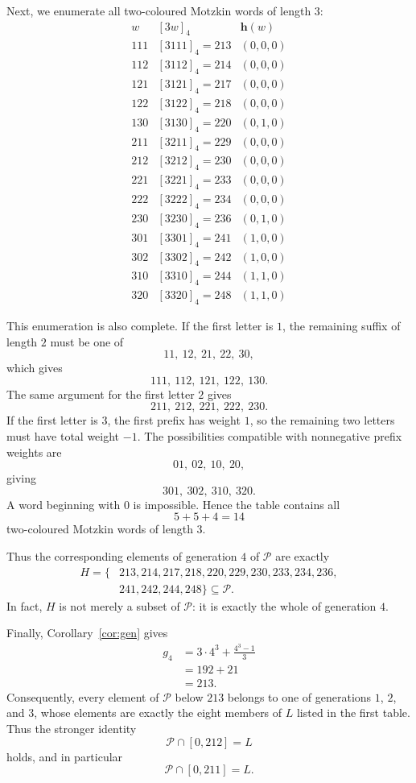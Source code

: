\documentclass[11pt]{article}
\theoremstyle{plain}
\theoremstyle{definition}
\newcommand{\Pset}{\mathcal P}
\begin{document}
Next, we enumerate all two-coloured Motzkin words of length $3$:
\[
\begin{array}{c|c|c}
 w&[3w]_4&\mathbf h(w)\\ \hline
111 &[3111]_4=213&(0,0,0)\\
112 &[3112]_4=214&(0,0,0)\\
121 &[3121]_4=217&(0,0,0)\\
122 &[3122]_4=218&(0,0,0)\\
130 &[3130]_4=220&(0,1,0)\\ \hline
211 &[3211]_4=229&(0,0,0)\\
212 &[3212]_4=230&(0,0,0)\\
221 &[3221]_4=233&(0,0,0)\\
222 &[3222]_4=234&(0,0,0)\\
230 &[3230]_4=236&(0,1,0)\\ \hline
301 &[3301]_4=241&(1,0,0)\\
302 &[3302]_4=242&(1,0,0)\\
310 &[3310]_4=244&(1,1,0)\\
320 &[3320]_4=248&(1,1,0)
\end{array}
\]

This enumeration is also complete.  If the first letter is $1$, the
remaining suffix of length $2$ must be one of
\[
 11,\ 12,\ 21,\ 22,\ 30,
\]
which gives
\[
 111,\ 112,\ 121,\ 122,\ 130.
\]
The same argument for the first letter $2$ gives
\[
 211,\ 212,\ 221,\ 222,\ 230.
\]
If the first letter is $3$, the first prefix has weight $1$, so the
remaining two letters must have total weight $-1$.  The possibilities
compatible with nonnegative prefix weights are
\[
 01,\ 02,\ 10,\ 20,
\]
giving
\[
 301,\ 302,\ 310,\ 320.
\]
A word beginning with $0$ is impossible.  Hence the table contains all
\[
 5+5+4=14
\]
two-coloured Motzkin words of length $3$.

Thus the corresponding elements of generation $4$ of $\Pset$ are exactly
\begin{equation}\label{eq:H-def}
\begin{split}
 H=\{&213,214,217,218,220,229,230,233,234,236,\\
     &241,242,244,248\}
 \subseteq\Pset.
\end{split}
\end{equation}
In fact, $H$ is not merely a subset of $\Pset$: it is exactly the whole of
generation $4$.

Finally, Corollary~\ref{cor:gen} gives
\[
\begin{aligned}
 g_4
 &=3\cdot4^3+\frac{4^3-1}{3}\\
 &=192+21\\
 &=213.
\end{aligned}
\]
Consequently, every element of $\Pset$ below $213$ belongs to one of
generations $1$, $2$, and $3$, whose elements are exactly the eight
members of $L$ listed in the first table.  Thus the stronger identity
\[
 \Pset\cap[0,212]=L
\]
holds, and in particular
\begin{equation}\label{eq:P-small}
 \Pset\cap[0,211]=L.
\end{equation}
\end{document}
